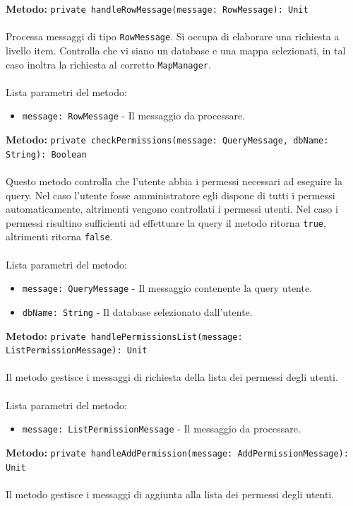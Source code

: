\documentclass[a4paper]{article}
\begin{document}
		\textbf{Metodo: }\texttt{private handleRowMessage(message: RowMessage): Unit}
			\\ \\
			Processa messaggi di tipo \texttt{RowMessage}. Si occupa di elaborare una richiesta a livello item. Controlla che vi siano un database e una mappa selezionati, in tal caso inoltra la richiesta al corretto \texttt{MapManager}.
			\\ \\
			Lista parametri del metodo:
			\begin{itemize}
				\item \texttt{message: RowMessage} - Il messaggio da processare.
			\end{itemize}	
		\textbf{Metodo: }\texttt{private checkPermissions(message: QueryMessage, dbName: String): Boolean}
			\\ \\
			Questo metodo controlla che l'utente abbia i permessi necessari ad eseguire la query. Nel caso l'utente fosse amministratore egli dispone di tutti i permessi automaticamente, altrimenti vengono controllati i permessi utenti. Nel caso i permessi risultino sufficienti ad effettuare la query il metodo ritorna \texttt{true}, altrimenti ritorna \texttt{false}.
			\\ \\
			Lista parametri del metodo:
			\begin{itemize}
				\item \texttt{message: QueryMessage} - Il messaggio contenente la query utente.
				\item \texttt{dbName: String} - Il database selezionato dall'utente.
			\end{itemize}	
		\textbf{Metodo: }\texttt{private handlePermissionsList(message: ListPermissionMessage): Unit}
			\\ \\
			Il metodo gestisce i messaggi di richiesta della lista dei permessi degli utenti.
			\\ \\
			Lista parametri del metodo:
			\begin{itemize}
				\item \texttt{message: ListPermissionMessage} - Il messaggio da processare.
			\end{itemize}	
		\textbf{Metodo: }\texttt{private handleAddPermission(message: AddPermissionMessage): Unit}
			\\ \\
			Il metodo gestisce i messaggi di aggiunta alla lista dei permessi degli utenti.
\end{document}
